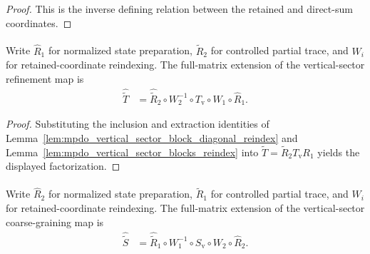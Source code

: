 \begin{proof}\leanok
    This is the inverse defining relation between the retained and direct-sum
    coordinates.
\end{proof}

\begin{lemma}
    \label{lem:mpdo_transported_vertical_sector_t_extension}
    \leanok
    Write $\widehat R_1$ for normalized state preparation,
    $\widehat{\widetilde R}_2$ for controlled partial trace, and $W_i$ for
    retained-coordinate reindexing. The full-matrix extension of the
    vertical-sector refinement map is
    \begin{align}
        \widehat{\widetilde T}
         & =\widehat{\widetilde R}_2\circ W_2^{-1}\circ
        T_{\mathrm v}\circ W_1\circ\widehat R_1.
        \label{eq:rfp_refinement_extension}
    \end{align}
\end{lemma}

\begin{proof}\leanok
    Substituting the inclusion and extraction identities of
    Lemma~\ref{lem:mpdo_vertical_sector_block_diagonal_reindex} and
    Lemma~\ref{lem:mpdo_vertical_sector_blocks_reindex} into
    $\widetilde T=\widetilde R_2T_{\mathrm v}R_1$ yields the displayed
    factorization.
\end{proof}

\begin{lemma}
    \label{lem:mpdo_transported_vertical_sector_s_extension}
    \leanok
    Write $\widehat R_2$ for normalized state preparation,
    $\widehat{\widetilde R}_1$ for controlled partial trace, and $W_i$ for
    retained-coordinate reindexing. The full-matrix extension of the
    vertical-sector coarse-graining map is
    \begin{align}
        \widehat{\widetilde S}
         & =\widehat{\widetilde R}_1\circ W_1^{-1}\circ
        S_{\mathrm v}\circ W_2\circ\widehat R_2.
        \label{eq:rfp_coarse_extension}
    \end{align}
\end{lemma}

